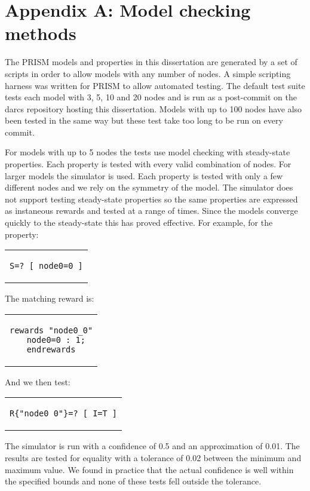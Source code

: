 \documentclass[a4paper,10pt]{article}
\newenvironment{prismprop}[0]{
  \begin{center}
  \begin{tabular}{c}
  \footnotesize
}{
  \end{tabular}
  \end{center}
}
\begin{document}
\section*{Appendix A: Model checking methods}

The PRISM models and properties in this dissertation are generated by a set of scripts in order to allow models with any number of nodes. A simple scripting harness was written for PRISM to allow automated testing. The default test suite tests each model with 3, 5, 10 and 20 nodes and is run as a post-commit on the darcs repository hosting this dissertation. Models with up to 100 nodes have also been tested in the same way but these test take too long to be run on every commit. 

For models with up to 5 nodes the tests use model checking with steady-state properties. Each property is tested with every valid combination of nodes. For larger models the simulator is used. Each property is tested with only a few different nodes and we rely on the symmetry of the model. The simulator does not support testing steady-state properties so the same properties are expressed as instaneous rewards and tested at a range of times. Since the models converge quickly to the steady-state this has proved effective. For example, for the property:

\begin{prismprop}
\begin{lstlisting}
S=? [ node0=0 ]
\end{lstlisting}
\end{prismprop}

\noindent The matching reward is:

\begin{prismprop}
\begin{lstlisting}
rewards "node0_0"
  node0=0 : 1;
endrewards
\end{lstlisting}
\end{prismprop}

\noindent And we then test:

\begin{prismprop}
\begin{lstlisting}
R{"node0_0"}=? [ I=T ]
\end{lstlisting}
\end{prismprop}

The simulator is run with a confidence of 0.5 and an approximation of 0.01. The results are tested for equality with a tolerance of 0.02 between the minimum and maximum value. We found in practice that the actual confidence is well within the specified bounds and none of these tests fell outside the tolerance.
\end{document}
